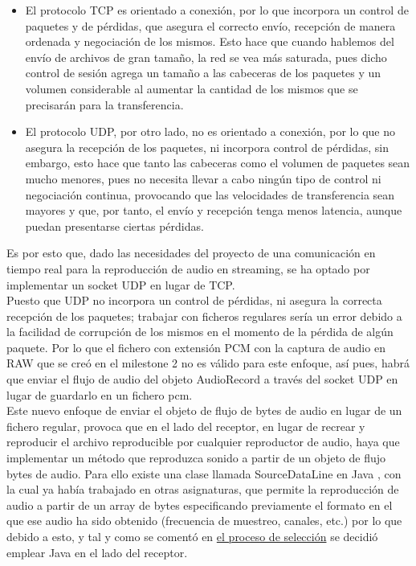 \begin{itemize}
    \item El protocolo TCP es orientado a conexión, por lo que incorpora un
    control de paquetes y de pérdidas, que asegura el correcto envío, recepción
    de manera ordenada y negociación de los mismos. Esto hace que cuando
    hablemos del envío de archivos de gran tamaño, la red se vea más saturada,
    pues dicho control de sesión agrega un tamaño a las cabeceras de los
    paquetes y un volumen considerable al aumentar la cantidad de los mismos que
    se precisarán para la transferencia.
    \item El protocolo UDP, por otro lado, no es orientado a conexión, por lo
    que no asegura la recepción de los paquetes, ni incorpora control de
    pérdidas, sin embargo, esto hace que tanto las cabeceras como el volumen de
    paquetes sean mucho menores, pues no necesita llevar a cabo ningún tipo de
    control ni negociación continua, provocando que las velocidades de
    transferencia sean mayores y que, por tanto, el envío y recepción tenga
    menos latencia, aunque puedan presentarse ciertas pérdidas.
\end{itemize}


Es por esto que, dado las necesidades del proyecto de una comunicación en tiempo
real para la reproducción de audio en streaming, se ha optado por implementar un
socket UDP en lugar de TCP.\\

Puesto que UDP no incorpora un control de pérdidas, ni asegura la correcta
recepción de los paquetes; trabajar con ficheros regulares sería un error debido
a la facilidad de corrupción de los mismos en el momento de la pérdida de algún
paquete. Por lo que el fichero con extensión PCM con la captura de audio en RAW
que se creó en el milestone 2 no es válido para este enfoque, así pues, habrá
que enviar el flujo de audio del objeto AudioRecord a través del socket UDP en
lugar de guardarlo en un fichero pcm.\\

Este nuevo enfoque de enviar el objeto de flujo de bytes de audio en lugar de un
fichero regular, provoca que en el lado del receptor, en lugar de recrear y
reproducir el archivo reproducible por cualquier reproductor de audio, haya que
implementar un método que reproduzca sonido a partir de un objeto de flujo bytes
de audio. Para ello existe una clase llamada SourceDataLine en Java
\cite{java-SourceDataLine}, con la cual ya había trabajado en otras asignaturas,
que permite la reproducción de audio a partir de un array de bytes especificando
previamente el formato en el que ese audio ha sido obtenido (frecuencia de
muestreo, canales, etc.) por lo que debido a esto, y tal y como se comentó en
\hyperref[seleccion-streaming-receptor]{el proceso de selección} se decidió
emplear Java en el lado del receptor.\\

